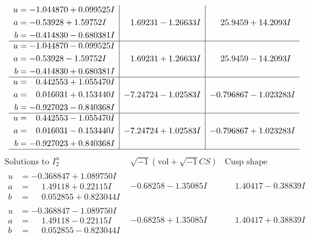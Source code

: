 \documentclass[1p]{elsarticle_modified}
\theoremstyle{definition}
\newcommand{\I}{\sqrt{-1}}
\begin{document}
$$\begin{array}{c|c|c}
\begin{aligned}
u &= -1.044870 + 0.099525 I \\
a &= -0.53928 + 1.59752 I \\
b &= -0.414830 - 0.680381 I\end{aligned}
 & \phantom{-}1.69231 - 1.26633 I & \phantom{-}25.9459 + 14.2093 I \\ \hline\begin{aligned}
u &= -1.044870 - 0.099525 I \\
a &= -0.53928 - 1.59752 I \\
b &= -0.414830 + 0.680381 I\end{aligned}
 & \phantom{-}1.69231 + 1.26633 I & \phantom{-}25.9459 - 14.2093 I \\ \hline\begin{aligned}
u &= \phantom{-}0.442553 + 1.055470 I \\
a &= \phantom{-}0.016031 + 0.153440 I \\
b &= -0.927023 - 0.840368 I\end{aligned}
 & -7.24724 - 1.02583 I & -0.796867 - 1.023283 I \\ \hline\begin{aligned}
u &= \phantom{-}0.442553 - 1.055470 I \\
a &= \phantom{-}0.016031 - 0.153440 I \\
b &= -0.927023 + 0.840368 I\end{aligned}
 & -7.24724 + 1.02583 I & -0.796867 + 1.023283 I\\
 \hline 
 \end{array}$$\newpage$$\begin{array}{c|c|c}  
\text{Solutions to }I^u_{2}& \I (\text{vol} + \sqrt{-1}CS) & \text{Cusp shape}\\
 \hline 
\begin{aligned}
u &= -0.368847 + 1.089750 I \\
a &= \phantom{-}1.49118 + 0.22115 I \\
b &= \phantom{-}0.052855 + 0.823044 I\end{aligned}
 & -0.68258 - 1.35085 I & \phantom{-}1.40417 - 0.38839 I \\ \hline\begin{aligned}
u &= -0.368847 - 1.089750 I \\
a &= \phantom{-}1.49118 - 0.22115 I \\
b &= \phantom{-}0.052855 - 0.823044 I\end{aligned}
 & -0.68258 + 1.35085 I & \phantom{-}1.40417 + 0.38839 I \\ \hline\begin{aligned}

\end{aligned}
\end{array}$$
\end{document}
